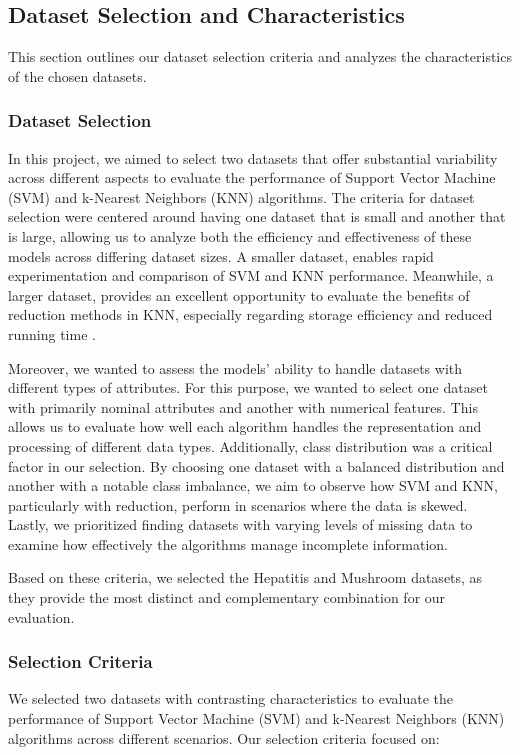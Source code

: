 \subsection{Dataset Selection and Characteristics}
\label{subsec:dataset}

This section outlines our dataset selection criteria and analyzes the characteristics of the chosen datasets.

\subsubsection{Dataset Selection}
In this project, we aimed to select two datasets that offer substantial variability across different aspects to evaluate the performance of Support Vector Machine (SVM) and k-Nearest Neighbors (KNN) algorithms.
The criteria for dataset selection were centered around having one dataset that is small and another that is large, allowing us to analyze both the efficiency and effectiveness of these models across differing dataset sizes.
A smaller dataset, enables rapid experimentation and comparison of SVM and KNN performance.
Meanwhile, a larger dataset, provides an excellent opportunity to evaluate the benefits of reduction methods in KNN, especially regarding storage efficiency and reduced running time \cite{distance_func_knn}.

Moreover, we wanted to assess the models' ability to handle datasets with different types of attributes.
For this purpose, we wanted to select one dataset with primarily nominal attributes and another with numerical features.
This allows us to evaluate how well each algorithm handles the representation and processing of different data types.
Additionally, class distribution was a critical factor in our selection. By choosing one dataset with a balanced distribution and another with a notable class imbalance, we aim to observe how SVM and KNN, particularly with reduction, perform in scenarios where the data is skewed.
Lastly, we prioritized finding datasets with varying levels of missing data to examine how effectively the algorithms manage incomplete information.

Based on these criteria, we selected the Hepatitis and Mushroom datasets, as they provide the most distinct and complementary combination for our evaluation.
\subsubsection{Selection Criteria}
We selected two datasets with contrasting characteristics to evaluate the performance of Support Vector Machine (SVM) and k-Nearest Neighbors (KNN) algorithms across different scenarios. Our selection criteria focused on:

